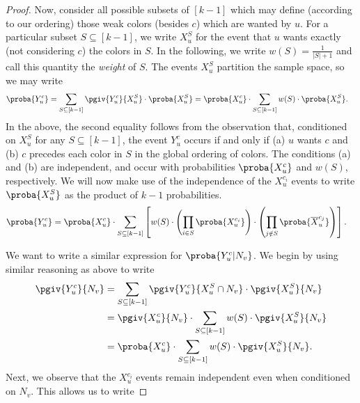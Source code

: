 \begin{proof}
	Now, consider all possible subsets of $[k - 1]$ which may define (according to our ordering) those weak colors (besides $c$) which are wanted by $u$. For a particular subset $S \subseteq [k - 1]$,
	we write $X_u^S$ for the event that $u$ wants exactly (not considering $c$) the colors in $S$. In the following, we write $w(S) = \frac{1}{|S| + 1}$ and call this quantity the \emph{weight} of $S$.
	The events $X_u^S$ partition the sample space,
	so we may write
	\begin{align*}
		\proba{Y_u^c} & = \sum_{S \subseteq [k - 1]} \pgiv{Y_u^c}{X_u^S}\cdot\proba{X_u^S} = \proba{X_u^c}\cdot\sum_{S \subseteq [k - 1]} w(S)\cdot\proba{X_u^S}.
	\end{align*}
	In the above, the second equality follows from the observation that, conditioned on $X_u^S$ for any $S \subseteq [k - 1]$, the event $Y_u^c$ occurs if and only if (a) $u$ wants $c$ and (b) $c$ precedes each color in $S$ in the global ordering of colors.
	The conditions (a) and (b) are independent, and occur with probabilities $\proba{X_u^c}$ and $w(S)$, respectively.
	We will now make use of the independence
	of the $X_u^{c_i}$ events to write $\proba{X_u^S}$ as the product of $k - 1$ probabilities.
	\begin{align}\label{eq:yuc}
		\proba{Y_u^c} & = \proba{X_u^c}\cdot\sum_{S \subseteq [k - 1]} \left[ w(S)\cdot \left( \prod_{i \in S}\proba{X_u^{c_i}}\right)\cdot\left(\prod_{j \notin S}\proba{\overline{X}_u^{c_j}}\right) \right].
	\end{align}

	We want to write a similar expression for $\proba{Y_u^c | N_v}$. We begin by using similar reasoning as above to write
	\begin{align*}
		\pgiv{Y_u^c}{N_v} & = \sum_{S \subseteq [k - 1]} \pgiv{Y_u^c}{X_u^S \cap N_v}\cdot\pgiv{X_u^S}{N_v} \\
		                  & = \pgiv{X_u^c}{N_v}\cdot \sum_{S \subseteq [k - 1]} w(S)\cdot\pgiv{X_u^S}{N_v}  \\
		                  & = \proba{X_u^c}\cdot \sum_{S \subseteq [k - 1]} w(S)\cdot\pgiv{X_u^S}{N_v}.
	\end{align*}
	Next, we observe that the $X_u^{c_i}$ events remain independent even when conditioned on $N_v$. This allows us to write


\end{proof}
